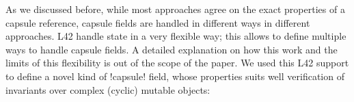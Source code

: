 As we discussed before, while most approaches agree on the exact properties of a capsule reference,
capsule fields are handled in different ways in different approaches. L42 handle state in a very flexible way; this allows to define multiple ways to handle capsule fields. A detailed explanation on how this work and the limits of this flexibility is out of the scope of the paper.
We used this L42 support to define a novel kind of \Q!capsule! field,
whose properties suits well verification of invariants over complex (cyclic) mutable objects:
